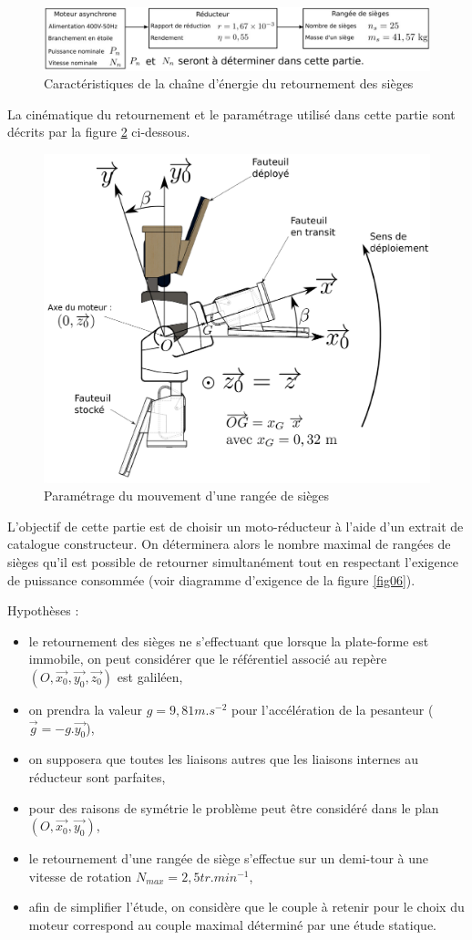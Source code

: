\begin{figure}[!h]
 \centering\includegraphics[width=0.7\linewidth]{img/fig12}
 \caption{Caractéristiques de la chaîne d'énergie du retournement des sièges}
 \label{fig12}
\end{figure}

La cinématique du retournement et le paramétrage utilisé dans cette partie sont décrits par la figure \ref{fig13} ci-dessous.

\begin{figure}[!h]
 \centering\includegraphics[width=0.7\linewidth]{img/fig13}
 \caption{Paramétrage du mouvement d'une rangée de sièges}
 \label{fig13}
\end{figure}

L'objectif de cette partie est de choisir un moto-réducteur à l'aide d'un extrait de catalogue constructeur. On déterminera alors le nombre maximal de rangées de sièges qu'il est possible de retourner simultanément tout en respectant l'exigence de puissance consommée (voir diagramme d'exigence de la figure \ref{fig06}).

Hypothèses :
\begin{itemize}
 \item le retournement des sièges ne s'effectuant que lorsque la plate-forme est immobile, on peut considérer que le référentiel associé au repère $(O,\overrightarrow{x_0},\overrightarrow{y_0},\overrightarrow{z_0})$ est galiléen,
 \item on prendra la valeur $g=9,81m.s^{-2}$ pour l'accélération de la pesanteur ($\overrightarrow{g}=-g.\overrightarrow{y_0}$),
 \item on supposera que toutes les liaisons autres que les liaisons internes au réducteur sont
parfaites,
 \item pour des raisons de symétrie le problème peut être considéré dans le plan $(O,\overrightarrow{x_0},\overrightarrow{y_0})$,
 \item le retournement d'une rangée de siège s'effectue sur un demi-tour à une vitesse de rotation $N_{max}=2,5tr.min^{-1}$,
 \item afin de simplifier l'étude, on considère que le couple à retenir pour le choix du moteur correspond au couple maximal déterminé par une étude statique.
\end{itemize}

